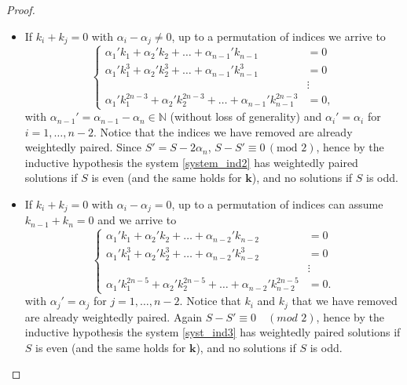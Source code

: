 \documentclass[10pt,a4paper]{amsart}
\def \N{\mathbb N}
\def \k{\bm{k}}
\begin{document}
\begin{proof}
\begin{itemize}
\item If $k_i+k_j=0$ with $\alpha_i-\alpha_j \neq 0$, up to a permutation of indices we arrive to 
\begin{equation} \label{system_ind2}
\begin{cases}
\alpha_1' k_1 + \alpha_2' k_2+\ldots+ \alpha_{n-1}' k_{n-1} & = 0 \\
\alpha_1' k_1^3 + \alpha_2' k_2^3 + \ldots+ \alpha_{n-1}' k_{n-1}^3 & = 0 \\
& \vdots \\
\alpha_1' k_1^{2n-3} + \alpha_2' k_2^{2n-3} +\ldots + \alpha_{n-1}' k_{n-1}^{2n-3} & =0,
\end{cases}
\end{equation}
with $\alpha_{n-1}' = \alpha_{n-1}-\alpha_{n} \in \N$ (without loss of generality) and $\alpha_i' = \alpha_i$ for $i=1,\ldots,n-2$. Notice that the indices we have removed are already weightedly paired. 
Since $S'=S-2\alpha_n$, $S-S' \equiv 0 \, (\mathrm{mod} \, \, 2)$, hence by the inductive hypothesis the system \eqref{system_ind2} has weightedly paired solutions if $S$ is even (and the same holds for $\k$), and no solutions if $S$ is odd. 

\item If $k_i+k_j=0$ with $\alpha_i-\alpha_j = 0$, up to a permutation of indices can assume $k_{n-1}+k_n=0$ and we arrive to 
\begin{equation} \label{syst_ind3}
\begin{cases}
\alpha_1' k_1 + \alpha_2' k_2+\ldots+ \alpha_{n-2}' k_{n-2} & = 0 \\
\alpha_1' k_1^3 + \alpha_2' k_2^3 + \ldots+ \alpha_{n-2}' k_{n-2}^3 & = 0 \\
& \vdots \\
\alpha_1' k_1^{2n-5} + \alpha_2' k_2^{2n-5} +\ldots + \alpha_{n-2}' k_{n-2}^{2n-5} & =0.
\end{cases}
\end{equation}
with $\alpha_j'=\alpha_j$ for $j=1,\ldots,n-2$.
Notice that $k_i$ and $k_j$ that we have removed are already weightedly paired. Again $S-S' \equiv 0 \quad (mod \, \, 2)$, hence by the inductive hypothesis the system \eqref{syst_ind3} has weightedly paired solutions if $S$ is even (and the same holds for $\k$), and no solutions if $S$ is odd. 
\end{itemize}
\end{proof}
\end{document}
